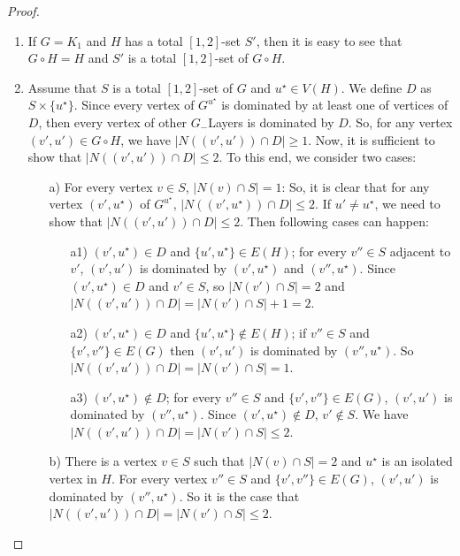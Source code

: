 \documentclass[A4,12pt]{article}
\theoremstyle{definition}
\theoremstyle{remark}
\begin{document}
\begin{proof}
\begin{enumerate}
\item
If $G=K_1$ and $H$ has a total $[1,2]$-set $S'$, then it is easy to see that $G \circ H=H$ and $S'$ is a  total $[1,2]$-set of $G \circ H$.
  \item
  Assume  that $S$ is a total $[1,2]$-set of $G$ and $u^{\star}\in V(H)$. We define $D$ as $S\times \{u^{\star}\}$. Since every vertex of $G^ {u^{\star}}$  is dominated by at least one of vertices of $D$, then every vertex of other $G_{-}$Layers is dominated by $D$. So, for any vertex $(v',u')\in G \circ H$, we have $\vert N((v',u')) \cap D\vert  \geq 1$. Now, it is sufficient to show that $\vert N((v',u')) \cap D\vert  \leq 2$. To this end, we  consider two cases:
  \begin{enumerate}
\item [a)]
For every vertex $v\in S$, $\vert N(v) \cap S\vert =1$: So, it is clear that for any vertex  $(v',u^{\star})$ of $G^ {u^{\star}}$, $\vert N((v',u^{\star})) \cap D\vert  \leq 2$. If $u'\neq u^{\star}$, we need to show that $\vert N((v',u')) \cap D\vert  \leq 2$. Then following cases can happen:
   \begin{itemize}
\item [a1)]
  $(v',u^{\star})\in D$ and $\{u',u^{\star}\}\in E(H)$; for every $v''\in S$  adjacent to  $v'$, $(v',u')$  is dominated by  $(v',u^{\star})$ and $(v'',u^{\star})$. Since $(v',  u^{\star})\in D$ and $v' \in S$, so $\vert N(v') \cap S\vert =2$ and $\vert N((v',u')) \cap D\vert =\vert N(v') \cap S\vert +1=2$.
\\
\item [a2)]
$(v',u^{\star})\in D$ and $\{u',u^{\star}\}\notin E(H)$; if $v''\in S$ and $\{v',v''\}\in E(G)$  then $(v',u')$ is dominated by  $(v'',u^{\star})$. So $\vert N((v',u')) \cap D\vert =\vert N(v') \cap S\vert =1$.
\\
 \item [a3)]
$(v',u^{\star})\notin D$; for every $v''\in S$ and $\{v',v''\}\in E(G)$, $(v',u')$ is dominated by  $(v'',u^{\star})$. Since $(v',u^{\star})\notin D$, $v'\notin S$. We have$\vert N((v',u')) \cap D\vert =\vert N(v') \cap S\vert \leq 2$.
\\
\end{itemize}

  \item [b)]
  There is a vertex $v\in S$ such that $\vert N(v) \cap S\vert =2$ and $u^{\star}$ is an isolated vertex in $H$. For every vertex $v''\in S$ and $\{v',v''\}\in E(G)$,  $(v',u')$  is dominated by $(v'',u^{\star})$. So it is the case that $\vert N((v',u')) \cap D\vert =\vert N(v') \cap S\vert \leq 2$.
  \end{enumerate}


\end{enumerate}
\end{proof}
\end{document}
